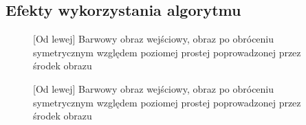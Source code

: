 \documentclass[a4paper,12pt, titlepage]{report}
\begin{document}
\subsection*{Efekty wykorzystania algorytmu}
\begin{figure}[h]
    \centering
    \caption{[Od lewej] Barwowy obraz wejściowy, obraz po obróceniu symetrycznym względem poziomej prostej poprowadzonej przez środek obrazu}%
    \label{fig:geo_after_grey1}%
\end{figure}
\FloatBarrier
\begin{figure}[h]
    \centering
    \caption{[Od lewej] Barwowy obraz wejściowy, obraz po obróceniu symetrycznym względem poziomej prostej poprowadzonej przez środek obrazu}%
    \label{fig:geo_after_grey1}%
\end{figure}
\FloatBarrier
\end{document}
